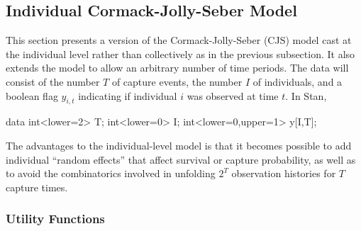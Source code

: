 \subsection{Individual Cormack-Jolly-Seber Model}

This section presents a version of the Cormack-Jolly-Seber (CJS) model
cast at the individual level rather than collectively as in the
previous subsection.  It also extends the model to allow an arbitrary
number of time periods.  The data will consist of the number $T$ of
capture events, the number $I$ of individuals, and a boolean flag
$y_{i,t}$ indicating if individual $i$ was observed at time $t$.  In
Stan,
%
\begin{stancode}
data {
  int<lower=2> T;
  int<lower=0> I;
  int<lower=0,upper=1> y[I,T];
}
\end{stancode}

The advantages to the individual-level model is that it becomes
possible to add individual ``random effects'' that affect survival or
capture probability, as well as to avoid the combinatorics involved in
unfolding $2^T$ observation histories for $T$ capture times.

\subsubsection{Utility Functions}

